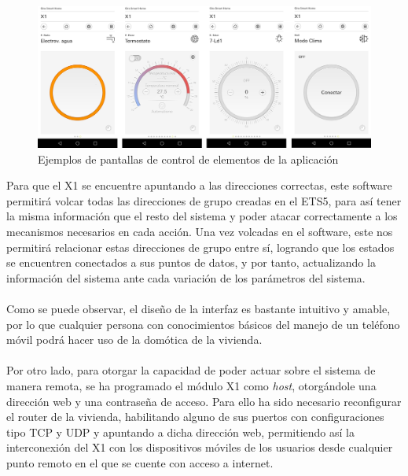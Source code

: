 \begin{figure}[H]
\centering
\includegraphics[width=1.15\textwidth]{figures/prog_x1_4.png}   
\caption{Ejemplos de pantallas de control de elementos de la aplicación}
\label{fig:prog_x1_4}
\end{figure}

Para que el X1 se encuentre apuntando a las direcciones correctas, este software permitirá volcar todas las direcciones de grupo creadas en el ETS5, para así tener la misma información que el resto del sistema y poder atacar correctamente a los mecanismos necesarios en cada acción. Una vez volcadas en el software, este nos permitirá relacionar estas direcciones de grupo entre sí, logrando que los estados se encuentren conectados a sus puntos de datos, y por tanto, actualizando la información del sistema ante cada variación de los parámetros del sistema.\\\\
Como se puede observar, el diseño de la interfaz es bastante intuitivo y amable, por lo que cualquier persona con conocimientos básicos del manejo de un teléfono móvil podrá hacer uso de la domótica de la vivienda.\\\\
Por otro lado, para otorgar la capacidad de poder actuar sobre el sistema de manera remota, se ha programado el módulo X1 como \textit{host}, otorgándole una dirección web y una contraseña de acceso. Para ello ha sido necesario reconfigurar el router de la vivienda, habilitando alguno de sus puertos con configuraciones tipo TCP y UDP y apuntando a dicha dirección web, permitiendo así la interconexión del X1 con los dispositivos móviles de los usuarios desde cualquier punto remoto en el que se cuente con acceso a internet. 
